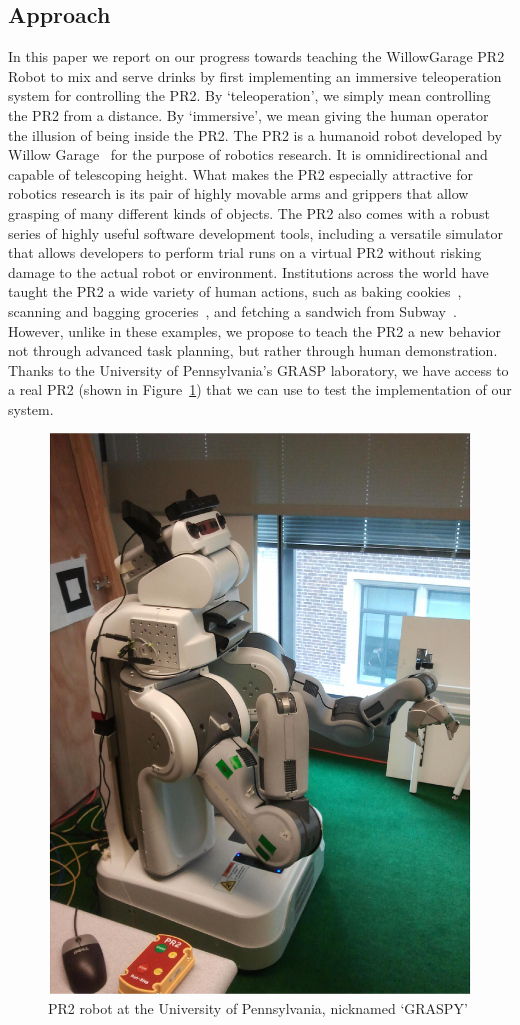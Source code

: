 \documentclass{sig-alternate}
\begin{document}
\subsection{Approach}
\indent In this paper we report on our progress towards teaching the WillowGarage PR2 Robot to mix and
serve drinks by first implementing an immersive teleoperation system for controlling the PR2. By `teleoperation', we simply mean controlling the PR2 from
a distance. By `immersive', we mean giving the human operator the illusion of being inside the PR2. The PR2 is a humanoid robot developed by  Willow Garage~\cite{pr2} for the purpose of robotics 
research. It is omnidirectional and capable of telescoping height. What makes the PR2 especially attractive for robotics research is its pair of highly movable arms and grippers that allow grasping of many different kinds of objects. The PR2 also comes with a robust series of highly useful software development tools,
including a versatile simulator that allows developers to perform trial runs on a virtual PR2 without
risking damage to the actual robot or environment. Institutions across the
world have taught the PR2 a wide variety of human actions, such as baking 
cookies~\cite{cookies}, scanning and bagging groceries~\cite{groceries}, and fetching a sandwich from 
Subway~\cite{subway}. However, unlike in these examples, we propose to teach the PR2 a new behavior not through advanced task planning, but rather through human
demonstration. Thanks to the University of Pennsylvania's GRASP laboratory, we have access to a real PR2 (shown in Figure~\ref{fig:pr2_photo}) that we can use to test the implementation of our system.\\
\begin{figure}[htb] 
	\begin{center}
		\includegraphics[width=0.75\linewidth]{graspy}
	\end{center}
	\caption{PR2 robot at the University of Pennsylvania, nicknamed `GRASPY'}
	\label{fig:pr2_photo}
\end{figure}
\end{document}
